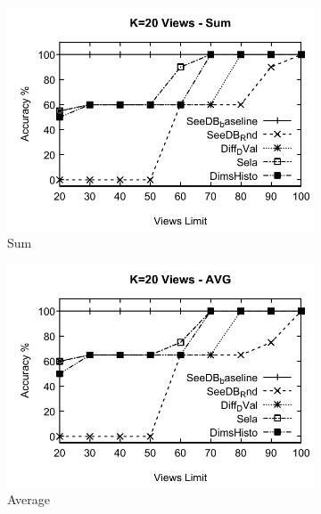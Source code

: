 \begin{figure}[h]
  \begin{subfigure}[b]{0.32\textwidth}
    \includegraphics[width=\textwidth]{SumA2.pdf}
    \caption{Sum}
     \label{fig:SumA2}%
  \end{subfigure}
  \begin{subfigure}[b]{0.32\textwidth}
    \includegraphics[width=\textwidth]{AvgA2.pdf}
     \caption{Average}
        \label{fig:AvgA2}
  \end{subfigure}
  \begin{subfigure}[b]{0.32\textwidth}

\end{subfigure}
\end{figure}

